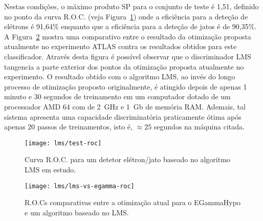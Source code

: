 Nestas condições, o máximo produto SP para o conjunto de teste é 1,51,
definido no ponto da curva R.O.C. (veja Figura~\ref{fig:lms-test-roc}) onde a
eficiência para a deteção de elétrons é 91,64\% enquanto que a eficiência para
a deteção de jatos é de 90,35\%. A Figura~\ref{fig:lms-vs-egamma-roc} mostra
uma comparativo entre o resultado da otimização proposta atualmente no
experimento ATLAS contra os resultados obtidos para este
classificador. Através desta figura é possível observar que o discriminador
LMS tangencia a parte exterior dos pontos da otimização proposta atualmente no
experimento. O resultado obtido com o algoritmo LMS, ao invés do longo
processo de otimização proposto originalmente, é atingido depois de apenas 1
minuto e 30 segundos de treinamento em um computador dotado de um processador
AMD 64 com  de 2~GHz e 1~Gb de memória RAM. Ademais, tal sistema
apresenta uma capacidade discriminatória praticamente ótima após apenas 20
passos de treinamentos, isto é, $\approx 25$ segundos na máquina citada.

\begin{figure}
\begin{center}
\texttt{[image: lms/test-roc]}
\end{center}
\caption{Curva R.O.C. para um detetor elétron/jato baseado no algoritmo LMS em
estudo.}
\label{fig:lms-test-roc}
\end{figure}

\begin{figure}
\begin{center}
\texttt{[image: lms/lms-vs-egamma-roc]}
\end{center}
\caption{R.O.Cs comparativas entre a otimização atual para o EGammaHypo e um
algoritmo baseado no LMS.}
\label{fig:lms-vs-egamma-roc}
\end{figure}

